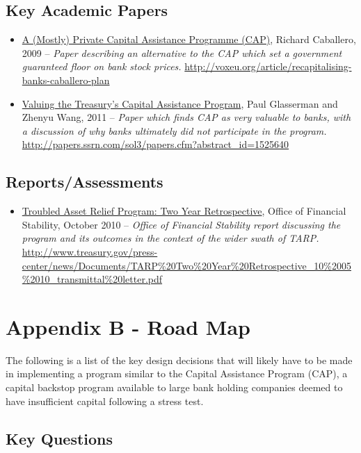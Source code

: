 \documentclass[12pt]{article}
\begin{document}
\subsection{Key Academic Papers}

\begin{itemize}
\item
\ul{A (Mostly) Private Capital Assistance Programme
(CAP)},
Richard Caballero, 2009 -- \emph{Paper describing an alternative to the CAP which set a government guaranteed floor on bank stock prices.} \url{http://voxeu.org/article/recapitalising-banks-caballero-plan}
\item
\ul{Valuing the Treasury's Capital Assistance Program},
Paul Glasserman and Zhenyu Wang, 2011 -- \emph{Paper
which finds CAP as very valuable to banks, with a discussion of why banks ultimately did not participate in the program.} \url{http://papers.ssrn.com/sol3/papers.cfm?abstract_id=1525640}
\end{itemize}

\subsection{Reports/Assessments}

\begin{itemize}
\item
\ul{Troubled
 Asset Relief Program: Two Year Retrospective}, Office of Financial
 Stability, October 2010 -- \emph{Office of Financial Stability report
 discussing the program and its outcomes in the context of the wider
 swath of TARP.} \url{http://www.treasury.gov/press-center/news/Documents/TARP\%20Two\%20Year\%20Retrospective_10\%2005\%2010_transmittal\%20letter.pdf}
\end{itemize}

\section{Appendix B - Road Map}

The following is a list of the key design decisions that will likely have to be made in implementing a program similar to the Capital Assistance Program (CAP), a capital backstop program available to large bank holding companies deemed to have insufficient capital following a stress test.

\subsection{Key Questions}
\end{document}
